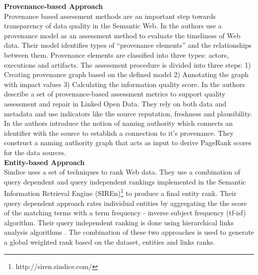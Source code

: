 \documentclass[onecolumn, crcready]{iosart2c}
\begin{document}
{\bf Provenance-based Approach}\\

Provenance based assessment methods are an important step towards transparency of data quality in the Semantic Web. In \cite{Hartig09usingweb} the authors use a provenance model as an assessment method to evaluate the timeliness of Web data. Their model identifies types of ``provenance elements'' and the relationships between them. Provenance elements are classified into three types: actors, executions and artifacts. The assessment procedure is divided into three steps: 1) Creating provenance graph based on the defined model 2) Annotating the graph with impact values 3) Calculating the information quality score. In \cite{Flouris2012} the authors describe a set of provenance-based assessment metrics to support quality assessment and repair in Linked Open Data. They rely on both data and metadata and use indicators like the source reputation, freshness and plausibility. In \cite{Harth2009} the authors introduce the notion of naming authority which connects an identifier with the source to establish a connection to it's provenance. They construct a naming authority graph that acts as input to derive PageRank scores for the data sources.\\

{\bf Entity-based Approach}\\

Sindice \cite{Delbru2010} uses a set of techniques to rank Web data. They use a combination of query dependent and query independent rankings implemented in the Semantic Information Retrieval Engine (SIREn)\footnote{http://siren.sindice.com/} to produce a final entity rank. Their query dependent approach rates individual entities by aggregating the the score of the matching terms with a term frequency - inverse subject frequency (tf-isf) algorithm. Their query independent ranking is done using hierarchical links analysis algorithms \cite{Delbru2010a}. The combination of these two approaches is used to generate a global weighted rank based on the dataset, entities and links ranks. \\
\end{document}
